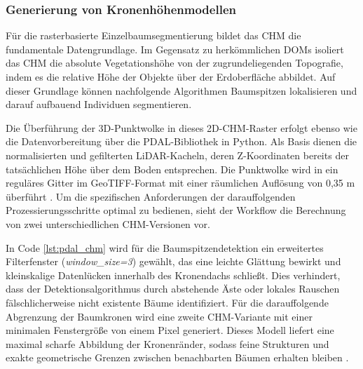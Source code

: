 \subsubsection{Generierung von Kronenhöhenmodellen}

Für die rasterbasierte Einzelbaumsegmentierung bildet das CHM die fundamentale Datengrundlage. Im Gegensatz zu herkömmlichen DOMs isoliert das CHM die absolute Vegetationshöhe von der zugrundeliegenden Topografie, indem es die relative Höhe der Objekte über der Erdoberfläche abbildet. Auf dieser Grundlage können nachfolgende Algorithmen Baumspitzen lokalisieren und darauf aufbauend Individuen segmentieren.

Die Überführung der 3D-Punktwolke in dieses 2D-CHM-Raster erfolgt ebenso wie die Datenvorbereitung über die PDAL-Bibliothek in Python. Als Basis dienen die normalisierten und gefilterten LiDAR-Kacheln, deren Z-Koordinaten bereits der tatsächlichen Höhe über dem Boden entsprechen. Die Punktwolke wird in ein reguläres Gitter im GeoTIFF-Format mit einer räumlichen Auflösung von 0,35 m überführt \cite{fuIndividualTreeSegmentationUAV2024}. Um die spezifischen Anforderungen der darauffolgenden Prozessierungsschritte optimal zu bedienen, sieht der Workflow die Berechnung von zwei unterschiedlichen CHM-Versionen vor. 



In Code \ref{lst:pdal_chm} wird für die Baumspitzendetektion ein erweitertes Filterfenster (\textit{window\_size=3}) gewählt, das eine leichte Glättung bewirkt und kleinskalige Datenlücken innerhalb des Kronendachs schließt. Dies verhindert, dass der Detektionsalgorithmus durch abstehende Äste oder lokales Rauschen fälschlicherweise nicht existente Bäume identifiziert. Für die darauffolgende Abgrenzung der Baumkronen wird eine zweite CHM-Variante mit einer minimalen Fenstergröße von einem Pixel generiert. Dieses Modell liefert eine maximal scharfe Abbildung der Kronenränder, sodass feine Strukturen und exakte geometrische Grenzen zwischen benachbarten Bäumen erhalten bleiben \cite{munzingerMappingUrbanForest2022}.